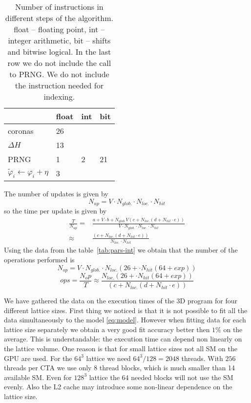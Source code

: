 \documentclass[a4paper]{llncs}
\newcommand{\vphi}{\varphi}
\begin{document}
\begin{table}
\begin{center} 
\begin{tabular}{|p{4cm}|l|l|l|}\hline\hline
 & float & int  & bit \\\hline
coronas & 26 & & \\\hline
$\Delta H  $ & 13  & & \\\hline
PRNG & 1 & 2  & 21  \\\hline
$\widetilde{\vphi}_i \gets \vphi_i+\eta$& 3 & &\\\hline\hline
\end{tabular}
\end{center}
\caption{\label{tab:instr-count}Number of instructions in different steps of the
algorithm. float -- floating point, int -- integer arithmetic, bit -- shifts and
bitwise logical. In the last row we do not include the call to PRNG. We do not include the instruction needed for indexing.}
\end{table}

The number of updates is given by
\begin{equation}
N_{up}=V\cdot N_{glob.}\cdot N_{loc.}\cdot N_{hit}
\end{equation}
so the time per update is given by
\begin{equation}\begin{split}
\frac{T}{N_{up}}=&\frac{a+ V \cdot b + N_{glob.} V \left(c + N_{loc.}\left(d + N_{hit}\cdot e\right)\right)}{V\cdot N_{glob.}\cdot N_{loc.}\cdot N_{hit}}\\
\approx&
\frac{ \left(c + N_{loc.}\left(d + N_{hit}\cdot e\right)\right)}{N_{loc.}\cdot N_{hit}}
\end{split}
\end{equation}
Using the data from the table~\ref{tab:pars-int} we obtain that the number of the operations performed is
\begin{equation}
N_{op}=V\cdot N_{glob.}\cdot N_{loc.}(26+\cdot N_{hit}(64+exp))
\end{equation}
\begin{equation}
  ops=\frac{N_op}{T}\approx \frac{N_{loc.}(26+\cdot N_{hit}(64+exp))}{ \left(c + N_{loc.}\left(d + N_{hit}\cdot e\right)\right)}
\end{equation}

We have gathered the data on the execution times of the 3D program for
four different lattice sizes. First thing we noticed is that it is not
possible to fit all the data simultaneously to the model
\eqref{eq:model}. However when fitting data for each lattice size
separately we obtain a very good fit accuracy better then $1\%$ on the
average.  This is understandable: the execution time can depend non
linearly on the lattice volume.  One reason is that for small lattice
sizes not all SM on the GPU are used. For the $64^3$ lattice we need
$64^3/128=2048$ threads. With $256$ threads per CTA we use only $8$
thread blocks, which is much smaller than 14 available SM. Even for
$128^3$ lattice the 64 needed blocks will not use the SM evenly. Also
the L2 cache may introduce some non-linear dependence on the lattice
size.
\end{document}
